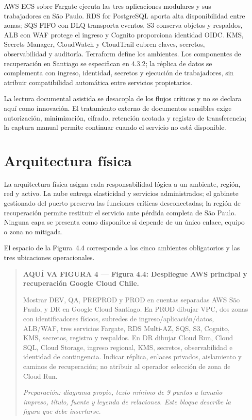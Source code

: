 \documentclass[11pt,letterpaper]{report}
\begin{document}
AWS ECS sobre Fargate ejecuta las tres aplicaciones modulares y sus trabajadores en São Paulo. RDS for PostgreSQL aporta alta disponibilidad entre zonas; SQS FIFO con DLQ transporta eventos, S3 conserva objetos y respaldos, ALB con WAF protege el ingreso y Cognito proporciona identidad OIDC. KMS, Secrets Manager, CloudWatch y CloudTrail cubren claves, secretos, observabilidad y auditoría. Terraform define los ambientes. Los componentes de recuperación en Santiago se especifican en 4.3.2; la réplica de datos se complementa con ingreso, identidad, secretos y ejecución de trabajadores, sin atribuir compatibilidad automática entre servicios propietarios.

La lectura documental asistida se desacopla de los flujos críticos y no se declara aquí como innovación. El tratamiento externo de documentos sensibles exige autorización, minimización, cifrado, retención acotada y registro de transferencia; la captura manual permite continuar cuando el servicio no está disponible.

\section{Arquitectura física}

La arquitectura física asigna cada responsabilidad lógica a un ambiente, región, red y activo. La nube entrega elasticidad y servicios administrados; el gabinete gestionado del puerto preserva las funciones críticas desconectadas; la región de recuperación permite restituir el servicio ante pérdida completa de São Paulo. Ninguna capa se presenta como disponible si depende de un único enlace, equipo o zona no mitigada.

El espacio de la Figura~4.4 corresponde a los cinco ambientes obligatorios y las tres ubicaciones operacionales.
\par\medskip
\begin{quote}\textbf{AQUÍ VA FIGURA 4 — Figura 4.4: Despliegue AWS principal y recuperación Google Cloud Chile.}\par Mostrar DEV, QA, PREPROD y PROD en cuentas separadas AWS São Paulo, y DR en Google Cloud Santiago. En PROD dibujar VPC, dos zonas con identificadores físicos, subredes de ingreso/aplicación/datos, ALB/WAF, tres servicios Fargate, RDS Multi-AZ, SQS, S3, Cognito, KMS, secretos, registro y respaldos. En DR dibujar Cloud Run, Cloud SQL, Cloud Storage, ingreso regional, KMS, secretos, observabilidad e identidad de contingencia. Indicar réplica, enlaces privados, aislamiento y caminos de recuperación; no atribuir al operador selección de zona de Cloud Run.\par\textit{Preparación: diagrama propio, texto mínimo de 9 puntos a tamaño impreso, título, fuente y leyenda de relaciones. Este bloque describe la figura que debe insertarse.}\end{quote}
\par\medskip
\end{document}
